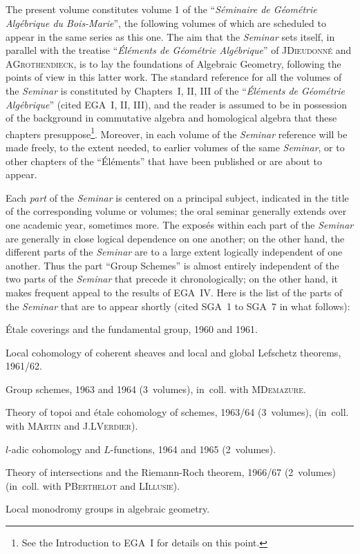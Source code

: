 \subsection{}
\label{I.introduction.2}
The present volume constitutes volume 1 of the ``\emph{S\'eminaire de
G\'eom\'etrie Alg\'ebrique du Bois-Marie}'', the following volumes of
which are scheduled to appear in the same series as this one. The aim
that the \emph{Seminar} sets itself, in parallel with the treatise
``\emph{\'El\'ements de G\'eom\'etrie Alg\'ebrique}'' of
J\ptbl \textsc{Dieudonn\'e} and A\ptbl \textsc{Grothendieck}, is to lay
the foundations of Algebraic Geometry, following the points of view in
this latter work. The standard reference for all the volumes of the
\emph{Seminar} is constituted by Chapters~I, II, III of the
``\emph{\'El\'ements de G\'eom\'etrie Alg\'ebrique}'' (cited EGA~I, II,
III), and the reader is assumed to be in possession of the background in
commutative algebra and homological algebra that these chapters
presuppose\footnote{See the Introduction to EGA~I for details on this
point.}. Moreover, in each volume of the \emph{Seminar} reference will
be made freely, to the extent needed, to earlier volumes of the same
\emph{Seminar}, or to other chapters of the ``\'El\'ements'' that have
been published or are about to appear.

Each \emph{part} of the \emph{Seminar} is centered on a principal
subject, indicated in the title of the corresponding volume or volumes;
the oral seminar generally extends over one academic year, sometimes
more. The expos\'es within each part of the \emph{Seminar} are generally
in close logical dependence on one another; on the other hand, the
different parts of the \emph{Seminar} are to a large extent logically
independent of one another. Thus the part ``Group Schemes'' is almost
entirely independent of the two parts of the \emph{Seminar} that precede
it chronologically; on the other hand, it makes frequent appeal to the
results of EGA~IV. Here is the list of the parts of the \emph{Seminar}
that are to appear shortly (cited SGA~1 to SGA~7 in what follows):
\begin{enumerateb}
\item[SGA 1.] \'Etale coverings and the fundamental group, 1960 and 1961.
\item[SGA 2.] Local cohomology of coherent sheaves and local and global
Lefschetz theorems, 1961/62.
\item[SGA 3.] Group schemes, 1963 and 1964 (3~volumes), in~coll. with
M\ptbl \textsc{Demazure}.
\item[SGA 4.] Theory of topoi and \'etale cohomology of schemes, 1963/64
(3~volumes), (in~coll. with M\ptbl \textsc{Artin} and
J.L\ptbl \textsc{Verdier}).
\item[SGA 5.] $l$-adic cohomology and $L$-functions, 1964 and 1965
(2~volumes).
\item[SGA 6.] Theory of intersections and the Riemann-Roch theorem,
1966/67 (2~volumes) (in~coll. with P\ptbl \textsc{Berthelot} and
L\ptbl \textsc{Illusie}).
\item[SGA 7.] Local monodromy groups in algebraic geometry.
\end{enumerateb}

